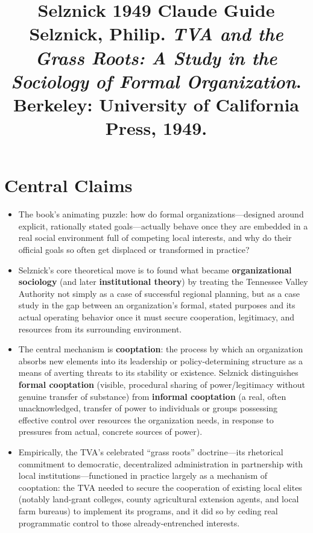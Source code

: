 \documentclass[12pt]{article}
\title{\textbf{Selznick 1949 Claude Guide}\\
\large Selznick, Philip. \textit{TVA and the Grass Roots: A Study in the Sociology of Formal Organization}.\\
Berkeley: University of California Press, 1949.}
\author{}
\date{}
\begin{document}
\maketitle
\tableofcontents
\newpage

\section{Central Claims}

\begin{itemize}[leftmargin=*, itemsep=4pt]
    \item The book's animating puzzle: how do formal organizations---designed around explicit, rationally stated goals---actually behave once they are embedded in a real social environment full of competing local interests, and why do their official goals so often get displaced or transformed in practice?
    \item Selznick's core theoretical move is to found what became \textbf{organizational sociology} (and later \textbf{institutional theory}) by treating the Tennessee Valley Authority not simply as a case of successful regional planning, but as a case study in the gap between an organization's formal, stated purposes and its actual operating behavior once it must secure cooperation, legitimacy, and resources from its surrounding environment.
    \item The central mechanism is \textbf{cooptation}: the process by which an organization absorbs new elements into its leadership or policy-determining structure as a means of averting threats to its stability or existence. Selznick distinguishes \textbf{formal cooptation} (visible, procedural sharing of power/legitimacy without genuine transfer of substance) from \textbf{informal cooptation} (a real, often unacknowledged, transfer of power to individuals or groups possessing effective control over resources the organization needs, in response to pressures from actual, concrete sources of power).
    \item Empirically, the TVA's celebrated ``grass roots'' doctrine---its rhetorical commitment to democratic, decentralized administration in partnership with local institutions---functioned in practice largely as a mechanism of cooptation: the TVA needed to secure the cooperation of existing local elites (notably land-grant colleges, county agricultural extension agents, and local farm bureaus) to implement its programs, and it did so by ceding real programmatic control to those already-entrenched interests.

\end{itemize}
\end{document}
